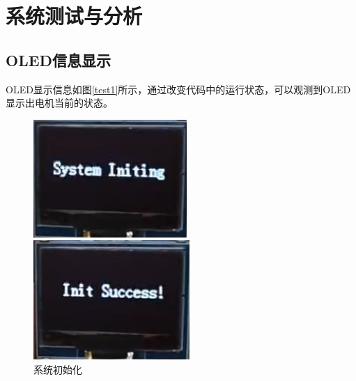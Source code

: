 ﻿\documentclass[12pt,a4paper]{article}
\begin{document}



\newpage
\section{系统测试与分析}
\subsection{OLED信息显示}
OLED显示信息如图\ref{test1}所示，通过改变代码中的运行状态，可以观测到OLED显示出电机当前的状态。

\begin{figure}[!htbp]
  \centering
  \begin{minipage}{0.29\linewidth}
    \centering
    \includegraphics[width=\linewidth]{picture/MODE1.png}
    \caption{系统初始化}
  \end{minipage}
  \begin{minipage}{0.29\linewidth}
    \centering
    \includegraphics[width=\linewidth]{picture/MODE2.png}

\end{minipage}
\end{figure}
\end{document}

